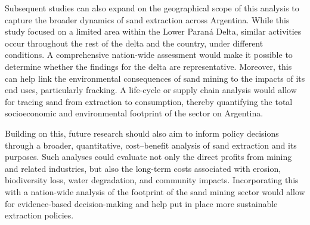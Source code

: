 Subsequent studies can also expand on the geographical scope of this analysis to capture the broader dynamics of sand extraction across Argentina. While this study focused on a limited area within the Lower Paraná Delta, similar activities occur throughout the rest of the delta and the country, under different conditions. A comprehensive nation-wide assessment would make it possible to determine whether the findings for the delta are representative. Moreover, this can help link the environmental consequences of sand mining to the impacts of its end uses, particularly fracking. A life-cycle or supply chain analysis would allow for tracing sand from extraction to consumption, thereby quantifying the total socioeconomic and environmental footprint of the sector on Argentina.

Building on this, future research should also aim to inform policy decisions through a broader, quantitative, cost–benefit analysis of sand extraction and its purposes. Such analyses could evaluate not only the direct profits from mining and related industries, but also the long-term costs associated with erosion, biodiversity loss, water degradation, and community impacts. Incorporating this with a nation-wide analysis of the footprint of the sand mining sector would allow for evidence-based decision-making and help put in place more sustainable extraction policies.